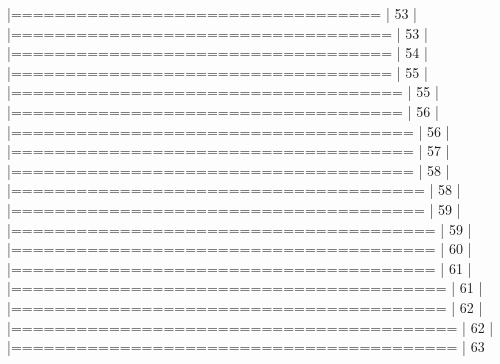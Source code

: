 \documentclass[10pt]{article}
\newenvironment{CodeChunk}{}{}
\begin{document}
\begin{CodeChunk}
\begin{CodeChunk}
\begin{CodeOutput}
  |==================================                               |  53%
  |                                                                       
  |===================================                              |  53%
  |                                                                       
  |===================================                              |  54%
  |                                                                       
  |===================================                              |  55%
  |                                                                       
  |====================================                             |  55%
  |                                                                       
  |====================================                             |  56%
  |                                                                       
  |=====================================                            |  56%
  |                                                                       
  |=====================================                            |  57%
  |                                                                       
  |=====================================                            |  58%
  |                                                                       
  |======================================                           |  58%
  |                                                                       
  |======================================                           |  59%
  |                                                                       
  |=======================================                          |  59%
  |                                                                       
  |=======================================                          |  60%
  |                                                                       
  |=======================================                          |  61%
  |                                                                       
  |========================================                         |  61%
  |                                                                       
  |========================================                         |  62%
  |                                                                       
  |=========================================                        |  62%
  |                                                                       
  |=========================================                        |  63%

\end{CodeOutput}
\end{CodeChunk}
\end{CodeChunk}
\end{document}
